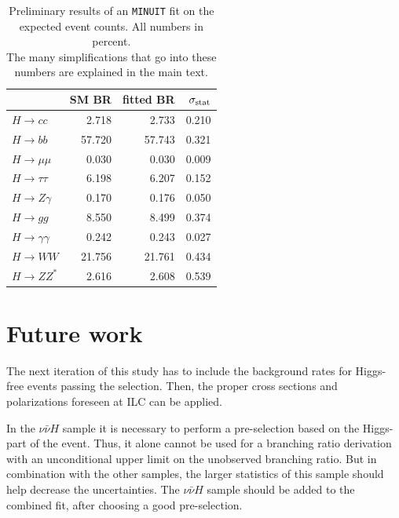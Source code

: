 \documentclass[11pt, hidelinks, a4paper]{scrartcl}
\newcommand{\tn}[1]{\textnormal{#1}}
\begin{document}
\begin{table}[ht]
    \centering
    \begin{tabular}{lrrr}
        \toprule
        {} &  SM BR &  fitted BR &  $\sigma_{\tn{stat}}$ \\
        \midrule
        $H\to cc$           &  2.718 &    2.733 &     0.210 \\
        $H\to bb$           & 57.720 &   57.743 &     0.321 \\
        $H\to \mu\mu$       &  0.030 &    0.030 &     0.009 \\
        $H\to \tau\tau$     &  6.198 &    6.207 &     0.152 \\
        $H\to Z\gamma$      &  0.170 &    0.176 &     0.050 \\
        $H\to gg$           &  8.550 &    8.499 &     0.374 \\
        $H\to \gamma\gamma$ &  0.242 &    0.243 &     0.027 \\
        $H\to WW$           & 21.756 &   21.761 &     0.434 \\
        $H\to ZZ^*$         &  2.616 &    2.608 &     0.539 \\
        \bottomrule
        \end{tabular}
    \caption{
        Preliminary results of an \texttt{MINUIT} fit on the expected event counts.
        All numbers in percent. \\
        The many simplifications that go into these numbers
        are explained in the main text.
        }\label{tab:br_uncertainties}
\end{table}

\section{Future work}\label{sec:future_work}
The next iteration of this study has to include the background rates for
Higgs-free events passing the selection.
Then, the proper cross sections and polarizations foreseen at ILC
can be applied.

In the $\nu \bar{\nu} H$ sample it is necessary to perform a pre-selection based on
the Higgs-part of the event.
Thus, it alone cannot be used for a branching ratio derivation with
an unconditional upper limit on the unobserved branching ratio.
But in combination with the other samples, the larger statistics of this
sample should help decrease the uncertainties.
The $\nu \bar{\nu} H$ sample should be added to the combined fit,
after choosing a good pre-selection.
\end{document}
